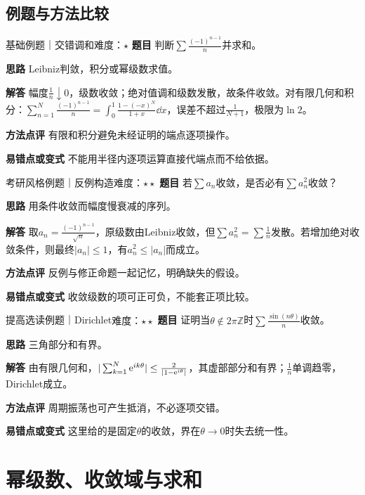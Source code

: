 \subsection{例题与方法比较}
\begin{example}{基础例题｜交错调和}{难度：$\star$}
\label{ex:9:4}\textbf{题目} 判断$\sum\frac{(-1)^{n-1}}{n}$并求和。\par
\textbf{思路} Leibniz判敛，积分或幂级数求值。\par
\textbf{解答} 幅度$\frac{1}{n}\downarrow0$，级数收敛；绝对值调和级数发散，故条件收敛。对有限几何和积分：$\sum_{n=1}^N\frac{(-1)^{n-1}}{n}=\int_0^1\frac{1-(-x)^N}{1+x}\dd x$，误差不超过$\frac{1}{N+1}$，极限为$\ln2$。\par
\textbf{方法点评} 有限和积分避免未经证明的端点逐项操作。\par
\textbf{易错点或变式} 不能用半径内逐项运算直接代端点而不给依据。
\end{example}
\begin{example}{考研风格例题｜反例构造}{难度：$\star\star$}
\label{ex:9:5}\textbf{题目} 若$\sum a_n$收敛，是否必有$\sum a_n^2$收敛？\par
\textbf{思路} 用条件收敛而幅度慢衰减的序列。\par
\textbf{解答} 取$a_n=\frac{(-1)^{n-1}}{\sqrt n}$，原级数由Leibniz收敛，但$\sum a_n^2=\sum\frac{1}{n}$发散。若增加绝对收敛条件，则最终$|a_n|\le1$，有$a_n^2\le|a_n|$而成立。\par
\textbf{方法点评} 反例与修正命题一起记忆，明确缺失的假设。\par
\textbf{易错点或变式} 收敛级数的项可正可负，不能套正项比较。
\end{example}
\begin{example}{提高选读例题｜Dirichlet}{难度：$\star\star$}
\label{ex:9:6}\textbf{题目} 证明当$\theta\notin2\pi\mathbb Z$时$\sum\frac{\sin(n\theta)}{n}$收敛。\par
\textbf{思路} 三角部分和有界。\par
\textbf{解答} 由有限几何和，$|\sum_{k=1}^N\mathrm{e}^{ik\theta}|\le\frac{2}{|1-\mathrm{e}^{i\theta}|}$，其虚部部分和有界；$\frac{1}{n}$单调趋零，Dirichlet成立。\par
\textbf{方法点评} 周期振荡也可产生抵消，不必逐项交错。\par
\textbf{易错点或变式} 这里给的是固定$\theta$的收敛，界在$\theta\to0$时失去统一性。
\end{example}
\section{幂级数、收敛域与求和}\label{sec:9:3}
